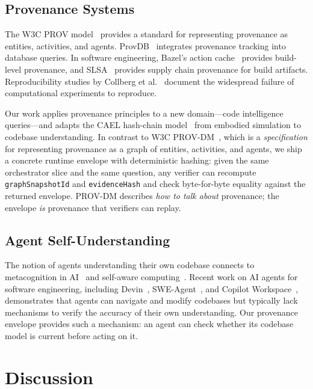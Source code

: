 \documentclass[conference]{IEEEtran}
\begin{document}
\subsection{Provenance Systems}

The W3C PROV model~\cite{Moreau2013} provides a standard for
representing provenance as entities, activities, and agents.
ProvDB~\cite{Arab2018} integrates provenance tracking into database
queries. In software engineering, Bazel's action
cache~\cite{Bazel2024} provides build-level provenance, and
SLSA~\cite{SLSA2023} provides supply chain provenance for build
artifacts. Reproducibility studies by
Collberg et al.~\cite{Collberg2016} document the widespread failure of
computational experiments to reproduce.

Our work applies provenance principles to a new domain---code
intelligence queries---and adapts the CAEL hash-chain
model~\cite{Krzywoszyja2026CAEL} from embodied simulation to codebase
understanding. In contrast to W3C PROV-DM~\cite{Moreau2013}, which is a
\emph{specification} for representing provenance as a graph of entities,
activities, and agents, we ship a concrete runtime envelope with
deterministic hashing: given the same orchestrator slice and the same
question, any verifier can recompute \texttt{graphSnapshotId} and
\texttt{evidenceHash} and check byte-for-byte equality against the
returned envelope. PROV-DM describes \emph{how to talk about} provenance;
the envelope \emph{is} provenance that verifiers can replay.

\subsection{Agent Self-Understanding}

The notion of agents understanding their own codebase connects to
metacognition in AI~\cite{Cox2005} and self-aware
computing~\cite{Kounev2017}. Recent work on AI agents for software
engineering, including Devin~\cite{DevinAI2024}, SWE-Agent~\cite{Yang2024},
and Copilot Workspace~\cite{CopilotWorkspace2024}, demonstrates that
agents can navigate and modify codebases but typically lack mechanisms
to verify the accuracy of their own understanding. Our provenance
envelope provides such a mechanism: an agent can check whether its
codebase model is current before acting on it.


\section{Discussion}
\label{sec:discussion}
\end{document}
